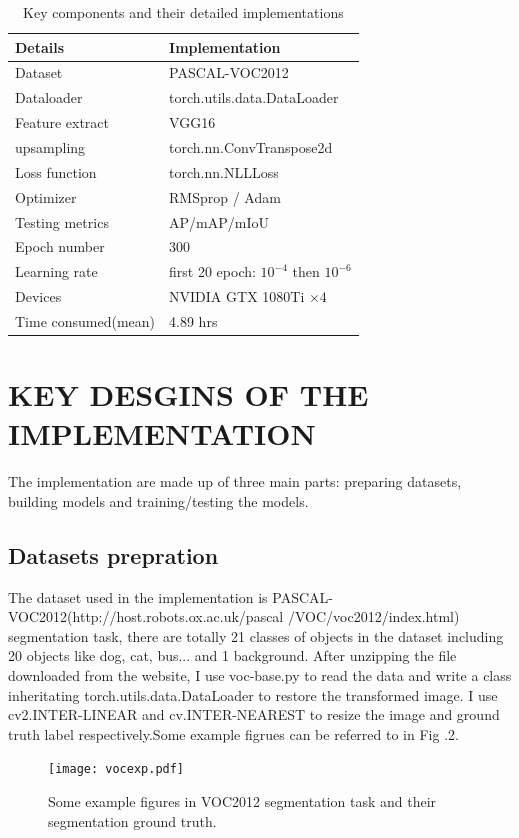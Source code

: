\documentclass[transmag]{IEEEtran}
\begin{document}
\begin{table}
  \centering
\caption{Key components and their detailed implementations}
\label{table}
\setlength{\tabcolsep}{3pt}
\begin{tabular}{|p{85pt}|p{125pt}|}
\hline
Details & Implementation \\
\hline
Dataset    &        PASCAL-VOC2012             \\
Dataloader &   torch.utils.data.DataLoader        \\
Feature extract   &      VGG16               \\
upsampling   &       torch.nn.ConvTranspose2d               \\
Loss function   &        torch.nn.NLLLoss             \\
Optimizer   &           RMSprop / Adam       \\
Testing metrics  &      AP/mAP/mIoU               \\
Epoch number & 300 \\
Learning rate & first 20 epoch: $10^{-4}$ then $10^{-6}$ \\
 Devices            &      NVIDIA GTX 1080Ti $\times4$              \\
 Time consumed(mean)   &    4.89 hrs   \\

\hline

\hline
\end{tabular}
\label{tab1}
\end{table}





\section{KEY DESGINS OF THE IMPLEMENTATION}
The implementation are made up of three main parts: preparing datasets, building models and training/testing the models.
\subsection{Datasets prepration}
 The dataset used in the implementation is PASCAL-VOC2012(http://host.robots.ox.ac.uk/pascal
 /VOC/voc2012/index.html) segmentation task, there are
 totally 21 classes of objects in the dataset including 20 objects like dog, cat, bus... and 1 background. After unzipping the file downloaded from
 the website, I use voc-base.py to read the data and write a class inheritating torch.utils.data.DataLoader to restore the transformed image.
I use cv2.INTER-LINEAR and cv.INTER-NEAREST to resize the image and ground truth label respectively.Some example figrues can be referred to in 
Fig .2.
\begin{figure}
  \centerline{\texttt{[image: vocexp.pdf]}}
  \caption{Some example figures in VOC2012
  segmentation task and their segmentation ground truth.\label{fig2}}
  \end{figure}
\end{document}

